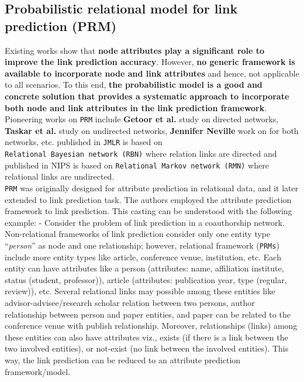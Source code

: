 \subsection{Probabilistic relational model for link prediction (PRM)}

Existing works show that \textbf{node attributes play a significant role
    to improve the link prediction accuracy}. However, \textbf{no generic
    framework is available to incorporate node and link attributes} and
hence, not applicable to all scenarios. To this end, \textbf{the
    probabilistic model is a good and concrete solution that provides a
    systematic approach to incorporate both node and link attributes in the
    link prediction framework}. Pioneering works on \texttt{PRM} include
\textbf{Getoor et al.} study on directed networks, \textbf{Taskar et
    al.} study on undirected networks, \textbf{Jennifer Neville}
work on for both networks, etc. published in \texttt{JMLR} is based on
\texttt{Relational\ Bayesian\ network\ (RBN)} where relation links are
directed and published in NIPS is based on
\texttt{Relational\ Markov\ network\ (RMN)} where relational links are
undirected.\\

\texttt{PRM} was originally designed for attribute prediction in
relational data, and it later extended to link prediction task. The
authors employed the attribute prediction framework to link prediction.
This casting can be understood with the following example: - Consider
the problem of link prediction in a coauthorship network. Non-relational
frameworks of link prediction consider only one entity type
``\emph{person}'' as node and one relationship; however, relational
framework (\texttt{PRMs}) include more entity types like article,
conference venue, institution, etc. Each entity can have attributes like
a person (attributes: name, affiliation institute, status (student,
professor)), article (attributes: publication year, type (regular,
review)), etc. Several relational links may possible among these
entities like advisor-advisee/research scholar relation between two
persons, author relationship between person and paper entities, and
paper can be related to the conference venue with publish relationship.
Moreover, relationships (links) among these entities can also have
attributes viz., exists (if there is a link between the two involved
entities), or not-exist (no link between the involved entities). This
way, the link prediction can be reduced to an attribute prediction
framework/model.\\

